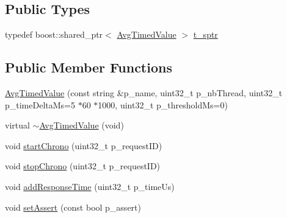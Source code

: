 \subsection*{Public Types}
\begin{DoxyCompactItemize}
\item 
typedef boost\+::shared\+\_\+ptr$<$ \hyperlink{classxtd_1_1counters_1_1AvgTimedValue}{Avg\+Timed\+Value} $>$ \hyperlink{classxtd_1_1counters_1_1AvgTimedValue_a68434add28044efc37c616ec7002d0f8}{t\+\_\+sptr}
\end{DoxyCompactItemize}
\subsection*{Public Member Functions}
\begin{DoxyCompactItemize}
\item 
\hyperlink{classxtd_1_1counters_1_1AvgTimedValue_a2c4e692d5e33a1155d7c869be55af0de}{Avg\+Timed\+Value} (const string \&p\+\_\+name, uint32\+\_\+t p\+\_\+nb\+Thread, uint32\+\_\+t p\+\_\+time\+Delta\+Ms=5 $\ast$60 $\ast$1000, uint32\+\_\+t p\+\_\+threshold\+Ms=0)
\item 
virtual \hyperlink{classxtd_1_1counters_1_1AvgTimedValue_a08aa140f45a1160943a494e5eab59aa7}{$\sim$\+Avg\+Timed\+Value} (void)
\item 
void \hyperlink{classxtd_1_1counters_1_1AvgTimedValue_ab5b5b6e1b4dae4bb4172ebc11ffc7c91}{start\+Chrono} (uint32\+\_\+t p\+\_\+request\+ID)
\item 
void \hyperlink{classxtd_1_1counters_1_1AvgTimedValue_a9a6818ff8c4f882a1445e9c49ed79e0f}{stop\+Chrono} (uint32\+\_\+t p\+\_\+request\+ID)
\item 
void \hyperlink{classxtd_1_1counters_1_1AvgTimedValue_a8d3f9dbf787c7c307957038a879fb69a}{add\+Response\+Time} (uint32\+\_\+t p\+\_\+time\+Us)
\item 
void \hyperlink{classxtd_1_1counters_1_1AvgTimedValue_a789b1bdb5596f6cb332435892411dbb0}{set\+Assert} (const bool p\+\_\+assert)
\end{DoxyCompactItemize}
